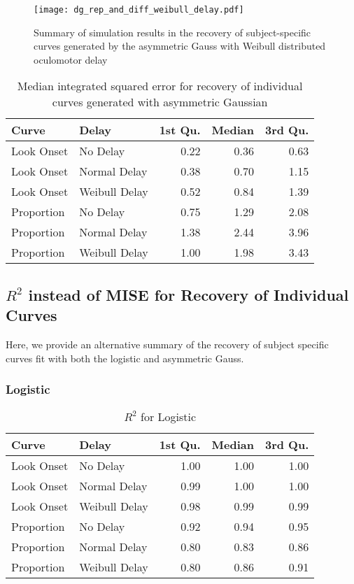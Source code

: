 \begin{figure}[H]
\centering
\texttt{[image: dg\_rep\_and\_diff\_weibull\_delay.pdf]}
\caption{Summary of simulation results in the recovery of subject-specific curves generated by the asymmetric Gauss with Weibull distributed oculomotor delay}
\label{fig:dg_rep_curves_weibull_delay}
\end{figure}




\begin{table}[ht]
\centering
\begin{tabular}{llrrr}
  \hline
Curve & Delay & 1st Qu. & Median & 3rd Qu. \\ 
  \hline
Look Onset & No Delay & 0.22 & 0.36 & 0.63 \\ 
  Look Onset & Normal Delay & 0.38 & 0.70 & 1.15 \\ 
  Look Onset & Weibull Delay & 0.52 & 0.84 & 1.39 \\ 
  Proportion & No Delay & 0.75 & 1.29 & 2.08 \\ 
  Proportion & Normal Delay & 1.38 & 2.44 & 3.96 \\ 
  Proportion & Weibull Delay & 1.00 & 1.98 & 3.43 \\ 
   \hline
\end{tabular}
\caption{Median integrated squared error for recovery of individual curves generated with asymmetric Gaussian}
\label{tab:dg_mise_sims}
\end{table}

\subsection{$R^2$ instead of MISE for Recovery of Individual Curves}

Here, we provide an alternative summary of the recovery of subject specific curves fit with both the logistic and asymmetric Gauss. 


\subsubsection{Logistic}

\begin{table}[H]
\centering
\begin{tabular}{llrrr}
  \hline
Curve & Delay & 1st Qu. & Median & 3rd Qu. \\ 
  \hline
Look Onset & No Delay & 1.00 & 1.00 & 1.00 \\ 
  Look Onset & Normal Delay & 0.99 & 1.00 & 1.00 \\ 
  Look Onset & Weibull Delay & 0.98 & 0.99 & 0.99 \\ 
  Proportion & No Delay & 0.92 & 0.94 & 0.95 \\ 
  Proportion & Normal Delay & 0.80 & 0.83 & 0.86 \\ 
  Proportion & Weibull Delay & 0.80 & 0.86 & 0.91 \\ 
   \hline
\end{tabular}
\caption{$R^2$ for Logistic}
\label{tab:r2_logistic_sims}
\end{table}


